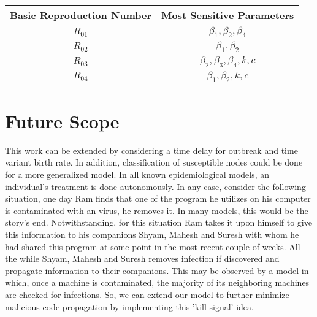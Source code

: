 \begin{itemize}
\begin{center}
\begin{tabular}{ |c|c| }
 \hline
  Basic Reproduction Number & Most Sensitive Parameters\\
  \hline
  $R_{01}$                  & $\beta_1,\beta_2,\beta_4$\\
  $R_{02}$                  & $\beta_1,\beta_2$  \\
  $R_{03}$                  & $\beta_2,\beta_3,\beta_4,k,c$ \\
  $R_{04}$                  & $\beta_1,\beta_2 ,k,c$\\
 \hline
\end{tabular}
\end{center}
\end{itemize}
\section{Future Scope}

This work can be extended by considering a time delay for outbreak and time variant birth rate. In addition, classification of susceptible nodes could be done for a more generalized model.
In all known epidemiological models, an individual's treatment is done autonomously. In any case, consider the following situation, one day Ram finds that one of the program he utilizes on his computer is contaminated with an virus, he removes it. In many models, this would be the story's end. Notwithstanding, for this situation Ram takes it upon himself to give this information to his companions Shyam, Mahesh and Suresh with whom he had shared this program at some point in the most recent couple of weeks. All the while Shyam, Mahesh and Suresh removes infection if discovered and propagate information to their companions. This may be observed by a model in which, once a machine is contaminated, the majority of its neighboring machines are checked for infections. So, we can extend our model to further minimize malicious code propagation by implementing this 'kill signal' idea.





















